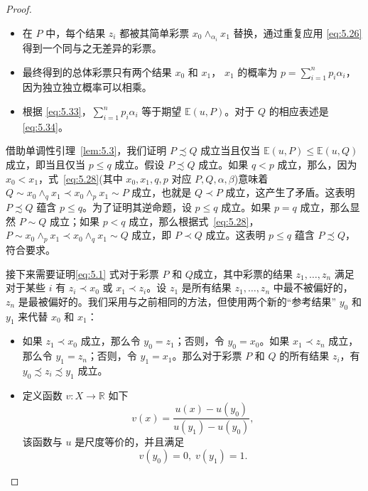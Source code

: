 \begin{proof}
\begin{itemize}
\item 在 \(P\) 中，每个结果 \({z}_{i}\) 都被其简单彩票 \({x}_{0}{ \land  }_{{\alpha }_{i}}{x}_{1}\) 替换，通过重复应用 \eqref{eq:5.26} 得到一个同与之无差异的彩票。

\item 最终得到的总体彩票只有两个结果 \({x}_{0}\) 和 \({x}_{1}\)， \({x}_{1}\) 的概率为 \(p = \mathop{\sum }\limits_{{i = 1}}^{n}{p}_{i}{\alpha }_{i}\)，因为独立独立概率可以相乘。

\item 根据 \eqref{eq:5.33}，\(\mathop{\sum }\limits_{{i = 1}}^{n}{p}_{i}{\alpha }_{i}\) 等于期望 \(\mathbb{E}\left( {u,P}\right)\)。对于 \(Q\) 的相应表述是 \eqref{eq:5.34}。
\end{itemize}

借助单调性引理~\ref{lem:5.3}，我们证明 \(P \precsim  Q\) 成立当且仅当 \(\mathbb{E}\left( {u,P}\right)  \leq  \mathbb{E}\left( {u,Q}\right)\) 成立，即当且仅当 \(p \leq  q\) 成立。假设 \(P \precsim  Q\) 成立。如果 \(q < p\) 成立，那么，因为 \({x}_{0} < {x}_{1}\)，式~\eqref{eq:5.28}(其中 \({x}_{0},{x}_{1},q,p\) 对应 \(P,Q,\alpha ,\beta\))意味着 \(Q \sim  {x}_{0}{ \land  }_{q}{x}_{1} \prec  {x}_{0}{ \land  }_{p}{x}_{1} \sim  P\) 成立，也就是 \(Q \prec  P\) 成立，这产生了矛盾。这表明 \(P \precsim  Q\) 蕴含 \(p \leq  q\)。为了证明其逆命题，设 \(p \leq  q\) 成立。如果 \(p = q\) 成立，那么显然 \(P \sim  Q\) 成立；如果 \(p < q\) 成立，那么根据式~\eqref{eq:5.28}， \(P \sim  {x}_{0}{ \land  }_{p}{x}_{1} \prec  {x}_{0}{ \land  }_{q}{x}_{1} \sim  Q\) 成立，即 \(P \prec  Q\) 成立。这表明 \(p \leq  q\) 蕴含 \(P \precsim  Q\)，符合要求。

接下来需要证明\eqref{eq:5.1} 式对于彩票 \(P\) 和 \(Q\)成立，其中彩票的结果 \({z}_{1},\ldots ,{z}_{n}\) 满足对于某些 \(i\) 有 \({z}_{i} \prec  {x}_{0}\) 或 \({x}_{1} \prec  {z}_{i}\)。设 \({z}_{1}\) 是所有结果 \({z}_{1},\ldots ,{z}_{n}\) 中最不被偏好的， \({z}_{n}\) 是最被偏好的。我们采用与之前相同的方法，但使用两个新的“参考结果” \({y}_{0}\) 和 \({y}_{1}\) 来代替 \({x}_{0}\) 和 \({x}_{1}\)：
\begin{itemize}
\item 如果 \({z}_{1} \prec  {x}_{0}\) 成立，那么令 \({y}_{0} = {z}_{1}\)；否则，令 \({y}_{0} = {x}_{0}\)。如果 \({x}_{1} \prec  {z}_{n}\) 成立，那么令 \({y}_{1} = {z}_{n}\)；否则，令 \({y}_{1} = {x}_{1}\)。那么对于彩票 \(P\) 和 \(Q\) 的所有结果 \({z}_{i}\)，有 \({y}_{0} \precsim  {z}_{i} \precsim  {y}_{1}\) 成立。

\item 定义函数 \(v : X \rightarrow  \mathbb{R}\) 如下
\[
v\left( x\right)  = \frac{u\left( x\right)  - u\left( {y}_{0}\right) }{u\left( {y}_{1}\right)  - u\left( {y}_{0}\right) },
\]
该函数与 \(u\) 是尺度等价的，并且满足
\[
v\left( {y}_{0}\right)  = 0,\;v\left( {y}_{1}\right)  = 1.
\]


\end{itemize}
\end{proof}
